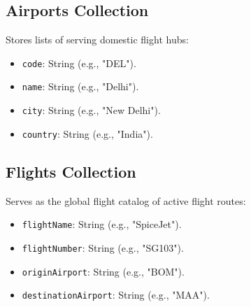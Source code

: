 \documentclass[12pt,a4paper]{article}
\begin{document}
\subsection{Airports Collection}
Stores lists of serving domestic flight hubs:
\begin{itemize}
    \item \texttt{code}: String (e.g., "DEL").
    \item \texttt{name}: String (e.g., "Delhi").
    \item \texttt{city}: String (e.g., "New Delhi").
    \item \texttt{country}: String (e.g., "India").
\end{itemize}

\subsection{Flights Collection}
Serves as the global flight catalog of active flight routes:
\begin{itemize}
    \item \texttt{flightName}: String (e.g., "SpiceJet").
    \item \texttt{flightNumber}: String (e.g., "SG103").
    \item \texttt{originAirport}: String (e.g., "BOM").
    \item \texttt{destinationAirport}: String (e.g., "MAA").
\end{itemize}
\end{document}
